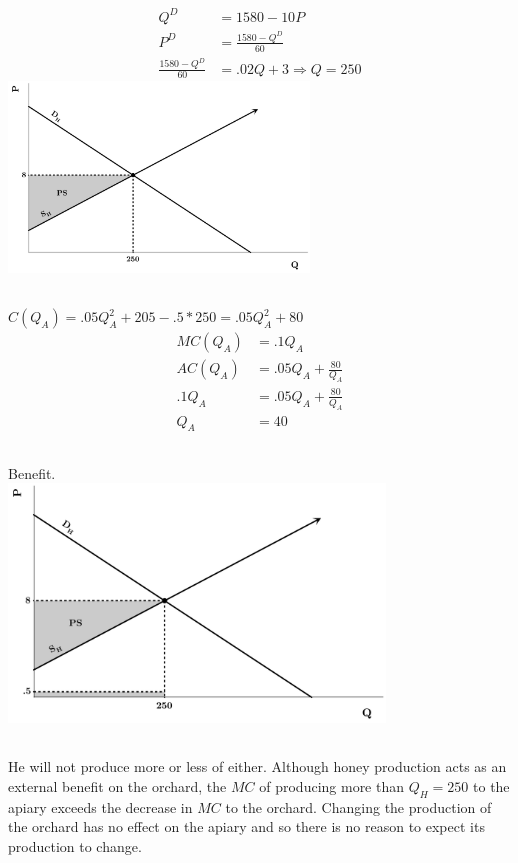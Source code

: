 \documentclass{article}
\begin{document}
	\subsection[c]{}
		\begin{align*}
			Q^D &= 1580-10P\\
			P^D &= \frac{1580-Q^D}{60}\\
			\frac{1580-Q^D}{60} &= .02Q+3 \Rightarrow Q = 250
		\end{align*}
		\includegraphics[height=2in]{Charts/4c}
	\subsection[d]{}
		$C(Q_A) = .05Q_A^2+205-.5*250=.05Q_A^2+80$
		\begin{align}
			MC(Q_A) &= .1Q_A \\
			AC(Q_A) &= .05Q_A + \frac{80}{Q_A}\\
			.1Q_A &= .05Q_A + \frac{80}{Q_A}\\
			Q_A &= 40
		\end{align}			
	\subsection[e]{}
		Benefit. \\
		\includegraphics[height=2.5in]{Charts/4e}
	\subsection[f]{}
		He will not produce more or less of either. Although honey production acts as an external benefit on the orchard, the $MC$ of producing more than $Q_H = 250$ to the apiary exceeds the decrease in $MC$ to the orchard. Changing the production of the orchard has no effect on the apiary and so there is no reason to expect its production to change. 
\end{document}
